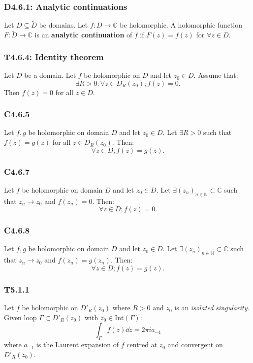 \documentclass{article}
\begin{document}
\begin{multicols*}{3}
\subsubsection*{D4.6.1: Analytic continuations}
Let $D\subseteq\tilde{D}$ be domains. Let $f:D\rightarrow\mathbb{C}$
be holomorphic. A holomorphic function $F:\tilde{D}\rightarrow\mathbb{C}$
is an \textbf{analytic continuation} of $f$ if $F(z)=f(z)$ for $\forall z\in D$.

\subsubsection*{T4.6.4: Identity theorem}
Let $D$ be a domain. Let $f$ be holomorphic on $D$ and let $z_0\in D$.
Assume that:
$$\exists R>0:\forall z\in D_R(z_0);f(z)=0.$$
Then $f(z)=0$ for all $z\in D$.

\subsubsection*{C4.6.5}
Let $f,g$ be holomorphic on domain $D$ and let $z_0\in D$.
Let $\exists R>0$ such that $f(z)=g(z)$ for all $z\in D_R(z_0)$. Then:
$$\forall z\in D; f(z)=g(z).$$

\subsubsection*{C4.6.7}
Let $f$ be holomorphic on domain $D$ and let $z_0\in D$. Let
$\exists (z_n)_{n\in\mathbb{N}}\subset\mathbb{C}$ such that
$z_n\rightarrow z_0$ and $f(z_n)=0$. Then:
$$\forall z\in D;f(z)=0.$$

\subsubsection*{C4.6.8}
Let $f,g$ be holomorphic on domain $D$ and let $z_0\in D$. Let
$\exists (z_n)_{n\in\mathbb{N}}\subset\mathbb{C}$ such that
$z_n\rightarrow z_0$ and $f(z_n)=g(z_n)$. Then:
$$\forall z\in D;f(z)=g(z).$$

\subsubsection*{T5.1.1}
Let $f$ be holomorphic on $D'_R(z_0)$ where $R>0$ and
$z_0$ is an \textit{isolated singularity}.
Given loop $\Gamma\subset D'_R(z_0)$ with $z_0\in\text{Int}(\Gamma)$:
$$\int_{\Gamma}f(z)\dd z=2\pi i a_{-1}$$
where $a_{-1}$ is the Laurent expansion of $f$ centred at $z_0$
and convergent on $D'_R(z_0)$.


\end{multicols*}
\end{document}
